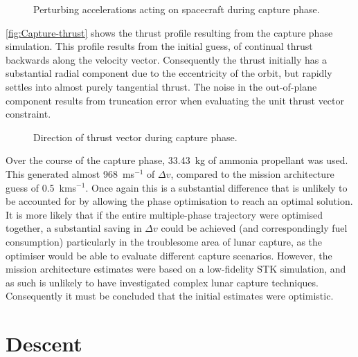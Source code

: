 \begin{figure}
\centering
\def\svgwidth{\figurewidth}

\caption{Perturbing accelerations acting on spacecraft during capture phase.} \label{fig:Capture-pert2}
\end{figure}

\autoref{fig:Capture-thrust} shows the thrust profile resulting from the capture phase simulation. This profile results from the initial guess, of continual thrust backwards along the velocity vector. Consequently the thrust initially has a substantial radial component due to the eccentricity of the orbit, but rapidly settles into almost purely tangential thrust. The noise in the out-of-plane component results from truncation error when evaluating the unit thrust vector constraint.

\begin{figure}
\centering
\def\svgwidth{\figurewidth}

\caption{Direction of thrust vector during capture phase.} \label{fig:Capture-thrust}
\end{figure}

Over the course of the capture phase, 33.43~kg of ammonia propellant was used. This generated almost 968~ms$^{-1}$ of $\Delta v$, compared to the mission architecture guess of 0.5~kms$^{-1}$. Once again this is a substantial difference that is unlikely to be accounted for by allowing the phase optimisation to reach an optimal solution. It is more likely that if the entire multiple-phase trajectory were optimised together, a substantial saving in $\Delta v$ could be achieved (and correspondingly fuel consumption) particularly in the troublesome area of lunar capture, as the optimiser would be able to evaluate different capture scenarios. However, the mission architecture estimates were based on a low-fidelity STK simulation, and as such is unlikely to have investigated complex lunar capture techniques. Consequently it must be concluded that the initial estimates were optimistic.



\clearpage


\section{Descent} \label{sec:Descent}

